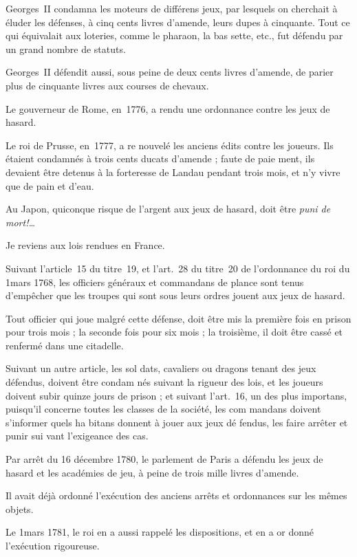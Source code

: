 Georges~II condamna les moteurs
de différens jeux, par lesquels on
cherchait à éluder les défenses, à cinq
cents livres d'amende, leurs dupes à 
cinquante. Tout ce qui équivalait aux
loteries, comme le pharaon, la bas%
sette, etc., fut défendu par un grand
nombre de statuts.

Georges~II défendit aussi, sous peine
de deux cents livres d'amende, de
parier plus de cinquante livres aux
courses de chevaux.

Le gouverneur de Rome, en~1776,
a rendu une ordonnance contre les
jeux de hasard.

Le roi de Prusse, en~1777, a re%
nouvelé les anciens édits contre les
joueurs. Ils étaient condamnés à trois
cents ducats d'amende ; faute de paie%
ment, ils devaient être detenus à la
forteresse de Landau pendant trois
mois, et n'y vivre que de pain et d'eau.

Au Japon, quiconque risque de
l'argent aux jeux de hasard, doit être
\emph{puni de mort!\ldots}

Je reviens aux lois rendues en
France.

Suivant l'article~15 du titre~19, et
l'art.~28 du titre~20 de l'ordonnance
du roi du 1\ier mars 1768, les officiers
généraux et commandans de plance
sont tenus d'empêcher que les troupes
qui sont sous leurs ordres jouent aux
jeux de hasard.

Tout officier qui joue malgré cette
défense, doit être mis la première fois
en prison pour trois mois ; la seconde
fois pour six mois ; la troisième, il
doit être cassé et renfermé dans une
citadelle.

Suivant un autre article, les sol%
dats, cavaliers ou dragons tenant des
jeux défendus, doivent être condam%
nés suivant la rigueur des lois, et les
joueurs doivent subir quinze jours
de prison ; et suivant l'art.~16, un des
plus importans, puisqu'il concerne
toutes les classes de la société, les com%
mandans doivent s'informer quels ha%
bitans donnent à jouer aux jeux dé%
fendus, les faire arrêter et punir sui%
vant l'exigeance des cas.

Par arrêt du 16 décembre 1780,
le parlement de Paris a défendu les
jeux de hasard et les académies de jeu,
à peine de trois mille livres d'amende.

Il avait déjà ordonné l'exécution
des anciens arrêts et ordonnances sur
les mêmes objets.

Le 1\ier mars 1781, le roi en a aussi
rappelé les dispositions, et en a or%
donné l'exécution rigoureuse.

